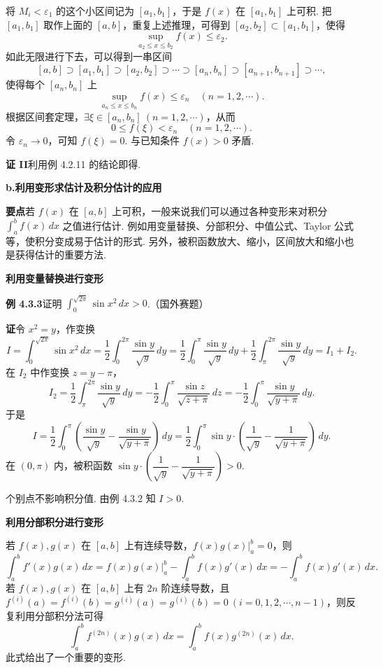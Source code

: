 \documentclass[UTF8,12pt,a4paper,fontset=fandol]{ctexart}
\begin{document}
将 $M_i<\varepsilon_1$ 的这个小区间记为 $[a_1,b_1]$，于是 $f(x)$ 在 $[a_1,b_1]$ 上可积. 把 $[a_1,b_1]$ 取作上面的 $[a,b]$，重复上述推理，可得到 $[a_2,b_2]\subset[a_1,b_1]$，使得
\[
\sup_{a_2\le x\le b_2} f(x)\le\varepsilon_2.
\]
如此无限进行下去，可以得到一串区间
\[
[a,b]\supset[a_1,b_1]\supset[a_2,b_2]\supset\cdots\supset[a_n,b_n]\supset[a_{n+1},b_{n+1}]\supset\cdots,
\]
使得每个 $[a_n,b_n]$ 上
\[
\sup_{a_n\le x\le b_n} f(x)\le\varepsilon_n\quad(n=1,2,\cdots).
\]
根据区间套定理，$\exists\xi\in[a_n,b_n]\ (n=1,2,\cdots)$，从而
\[
0\le f(\xi)<\varepsilon_n\quad(n=1,2,\cdots).
\]
令 $\varepsilon_n\to0$，可知 $f(\xi)=0$. 与已知条件 $f(x)>0$ 矛盾.

\noindent\textbf{证 II}\quad 利用例 4.2.11 的结论即得.

\noindent\textbf{b.\quad 利用变形求估计及积分估计的应用}

\noindent\textbf{要点}\quad 若 $f(x)$ 在 $[a,b]$ 上可积，一般来说我们可以通过各种变形来对积分 $\int_a^b f(x)\,dx$ 之值进行估计. 例如用变量替换、分部积分、中值公式、Taylor 公式等，使积分变成易于估计的形式. 另外，被积函数放大、缩小，区间放大和缩小也是获得估计的重要方法.

\noindent\textbf{利用变量替换进行变形}

\noindent\textbf{例 4.3.3}\quad 证明 $\int_0^{\sqrt{2\pi}}\sin x^2\,dx>0$.（国外赛题）

\noindent\textbf{证}\quad 令 $x^2=y$，作变换
\[
I=\int_0^{\sqrt{2\pi}}\sin x^2\,dx
=\frac12\int_0^{2\pi}\frac{\sin y}{\sqrt y}\,dy
=\frac12\int_0^\pi\frac{\sin y}{\sqrt y}\,dy
+\frac12\int_\pi^{2\pi}\frac{\sin y}{\sqrt y}\,dy
=I_1+I_2.
\]
在 $I_2$ 中作变换 $z=y-\pi$，
\[
I_2=\frac12\int_\pi^{2\pi}\frac{\sin y}{\sqrt y}\,dy
=-\frac12\int_0^\pi\frac{\sin z}{\sqrt{z+\pi}}\,dz
=-\frac12\int_0^\pi\frac{\sin y}{\sqrt{y+\pi}}\,dy.
\]
于是
\[
I=\frac12\int_0^\pi\left(\frac{\sin y}{\sqrt y}-\frac{\sin y}{\sqrt{y+\pi}}\right)\,dy
=\frac12\int_0^\pi\sin y\cdot\left(\frac1{\sqrt y}-\frac1{\sqrt{y+\pi}}\right)\,dy.
\]
在 $(0,\pi)$ 内，被积函数 $\sin y\cdot\left(\dfrac1{\sqrt y}-\dfrac1{\sqrt{y+\pi}}\right)>0$.

个别点不影响积分值. 由例 4.3.2 知 $I>0$.

\noindent\textbf{利用分部积分进行变形}

若 $f(x),g(x)$ 在 $[a,b]$ 上有连续导数，$f(x)g(x)\big|_a^b=0$，则
\[
\int_a^b f'(x)g(x)\,dx
=f(x)g(x)\bigg|_a^b-\int_a^b f(x)g'(x)\,dx
=-\int_a^b f(x)g'(x)\,dx.
\]
若 $f(x),g(x)$ 在 $[a,b]$ 上有 $2n$ 阶连续导数，且 $f^{(i)}(a)=f^{(i)}(b)=g^{(i)}(a)=g^{(i)}(b)=0\ (i=0,1,2,\cdots,n-1)$，则反复利用分部积分法可得
\[
\int_a^b f^{(2n)}(x)g(x)\,dx=\int_a^b f(x)g^{(2n)}(x)\,dx.
\tag{A}
\]
此式给出了一个重要的变形.
\end{document}
